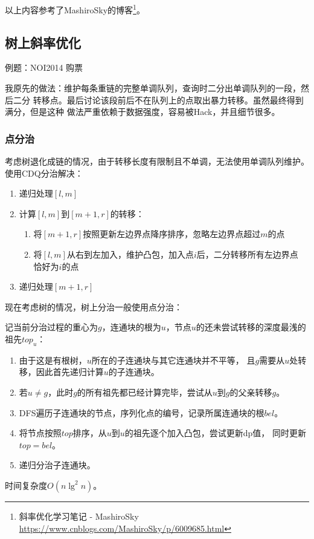 以上内容参考了MashiroSky的博客\footnote{斜率优化学习笔记 - MashiroSky
    \url{https://www.cnblogs.com/MashiroSky/p/6009685.html}
}。
\subsection{树上斜率优化}
例题：NOI2014 购票

我原先的做法：维护每条重链的完整单调队列，查询时二分出单调队列的一段，然后二分
转移点。最后讨论该段前后不在队列上的点取出暴力转移。虽然最终得到满分，但是这种
做法严重依赖于数据强度，容易被Hack，并且细节很多。
\subsubsection{点分治}
考虑树退化成链的情况，由于转移长度有限制且不单调，无法使用单调队列维护。使用CDQ分治解决：
\begin{enumerate}
    \item 递归处理$[l,m]$
    \item 计算$[l,m]$到$[m+1,r]$的转移：
    \begin{enumerate}
        \item 将$[m+1,r]$按照更新左边界点降序排序，忽略左边界点超过$m$的点
        \item 将$[l,m]$从右到左加入，维护凸包，加入点$i$后，二分转移所有左边界点
        恰好为$i$的点
    \end{enumerate}
    \item 递归处理$[m+1,r]$
\end{enumerate}

现在考虑树的情况，树上分治一般使用点分治：

记当前分治过程的重心为$g$，连通块的根为$u$，节点$u$的还未尝试转移的深度最浅的祖先$top_u$：
\begin{enumerate}
    \item 由于这是有根树，$u$所在的子连通块与其它连通块并不平等，
    且$g$需要从$u$处转移，因此首先递归计算$u$的子连通块。
    \item 若$u\neq g$，此时$g$的所有祖先都已经计算完毕，尝试从$u$到$g$的父亲转移$g$。
    \item DFS遍历子连通块的节点，序列化点的编号，记录所属连通块的根$bel$。
    \item 将节点按照$top$排序，从$u$到$u$的祖先逐个加入凸包，尝试更新dp值，
    同时更新$top=bel$。
    \item 递归分治子连通块。
\end{enumerate}

时间复杂度$O(n\lg^2 n)$。
